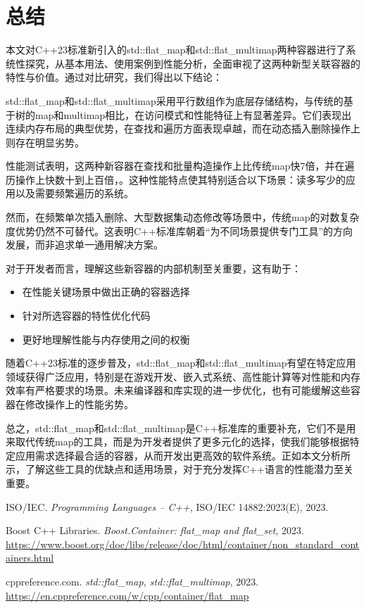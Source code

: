 \documentclass[a4paper, 12pt]{article}
\begin{document}
\section{总结}

本文对C++23标准新引入的std::flat\_map和std::flat\_multimap两种容器进行了系统性探究，从基本用法、使用案例到性能分析，全面审视了这两种新型关联容器的特性与价值。通过对比研究，我们得出以下结论：

std::flat\_map和std::flat\_multimap采用平行数组作为底层存储结构，与传统的基于树的map和multimap相比，在访问模式和性能特征上有显著差异。它们表现出连续内存布局的典型优势，在查找和遍历方面表现卓越，而在动态插入删除操作上则存在明显劣势。

性能测试表明，这两种新容器在查找和批量构造操作上比传统map快7倍，并在遍历操作上快数十到上百倍，。这种性能特点使其特别适合以下场景：读多写少的应用以及需要频繁遍历的系统。

然而，在频繁单次插入删除、大型数据集动态修改等场景中，传统map的对数复杂度优势仍然不可替代。这表明C++标准库朝着“为不同场景提供专门工具”的方向发展，而非追求单一通用解决方案。

对于开发者而言，理解这些新容器的内部机制至关重要，这有助于：
\begin{itemize}
    \setlength{\itemsep}{0pt}
    \setlength{\parsep}{0pt}
    \setlength{\parskip}{0pt}
    \item 在性能关键场景中做出正确的容器选择
    \item 针对所选容器的特性优化代码
    \item 更好地理解性能与内存使用之间的权衡
\end{itemize}

随着C++23标准的逐步普及，std::flat\_map和std::flat\_multimap有望在特定应用领域获得广泛应用，特别是在游戏开发、嵌入式系统、高性能计算等对性能和内存效率有严格要求的场景。未来编译器和库实现的进一步优化，也有可能缓解这些容器在修改操作上的性能劣势。

总之，std::flat\_map和std::flat\_multimap是C++标准库的重要补充，它们不是用来取代传统map的工具，而是为开发者提供了更多元化的选择，使我们能够根据特定应用需求选择最合适的容器，从而开发出更高效的软件系统。正如本文分析所示，了解这些工具的优缺点和适用场景，对于充分发挥C++语言的性能潜力至关重要。


\begin{thebibliography}{99}

ISO/IEC. \emph{Programming Languages -- C++}, ISO/IEC 14882:2023(E), 2023.

Boost C++ Libraries. \emph{Boost.Container: flat\_map and flat\_set}, 2023.
\\\url{https://www.boost.org/doc/libs/release/doc/html/container/non_standard_containers.html}

cppreference.com. \emph{std::flat\_map, std::flat\_multimap}, 2023.
\\\url{https://en.cppreference.com/w/cpp/container/flat_map}

\end{thebibliography}
\end{document}
